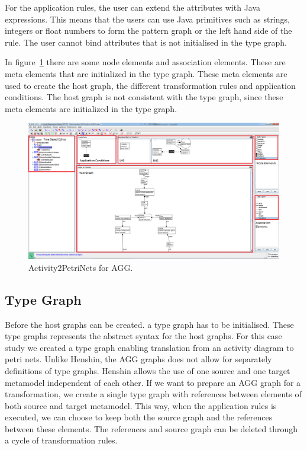 \documentclass[pdftex,11pt,a4paper]{article}
\begin{document}
For the application rules, the user can extend the attributes with Java
expressions. This means that the users can use Java primitives such as strings,
integers or float numbers to form the pattern graph or the left hand side of
the rule. The user cannot bind attributes that is not initialised in the type graph.

In figure~\ref{fig:AGGScreen} there are some node elements and association
elements. These are meta elements that are initialized in the type graph. These
meta elements are used to create the host graph, the different transformation
rules and application conditions. The host graph is not consistent with the
type graph, since these meta elements are initialized in the type graph. 

\begin{figure}[H]
	\centering
	\includegraphics[scale=0.3]{figures/AGGscreen.png}
	\caption{Activity2PetriNets for AGG.}
	\label{fig:AGGScreen}
\end{figure}

\subsection{Type Graph}

\noindent Before the host graphs can be created. a type graph has to be
initialised. These type graphs represents the abstract syntax for the host
graphs. For this case study we created a type graph enabling translation from
an activity diagram to petri nets. Unlike Henshin, the AGG graphs does not
allow for separately definitions of type graphs. Henshin allows the use of one
source and one target metamodel independent of each other. If we want to
prepare an AGG graph for a transformation, we create a single type graph with
references between elements of both source and target metamodel. This way, when
the application rules is executed, we can choose to keep both the source graph
and the references between these elements. The references and source graph can
be deleted through a cycle of transformation rules.
\end{document}
